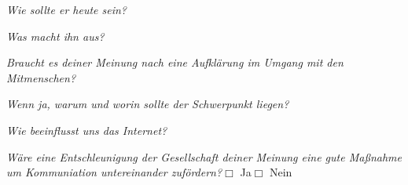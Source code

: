 \documentclass[a4paper,12pt]{scrartcl}
\newcommand{\checkbox}{\(\Box\)}
\newcommand{\frage}[1]{\textit{#1}}
\begin{document}
\frage{Wie sollte er heute sein?}
\vspace{2cm}

\frage{Was macht ihn aus?}
\vspace{2cm}

\newpage
\frage{Braucht es deiner Meinung nach eine Aufklärung im Umgang mit den Mitmenschen?}\\
\par
\frage{Wenn ja, warum und worin sollte der Schwerpunkt liegen?}
\vspace{3cm}

\frage{Wie beeinflusst uns das Internet?}
\vspace{4cm}

\frage{Wäre eine Entschleunigung der Gesellschaft deiner Meinung eine gute Maßnahme um Kommuniation untereinander zufördern?}\hfill\checkbox{} Ja\hspace{0.8cm}\checkbox{} Nein
\end{document}
